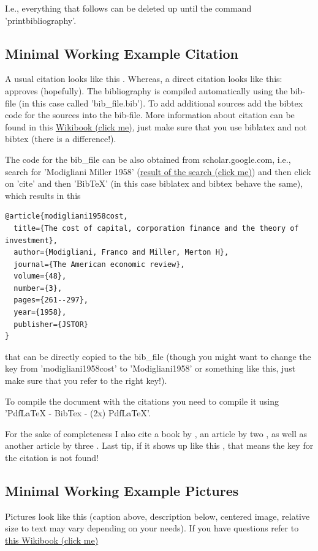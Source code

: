 \documentclass[12pt,a4paper]{article}
\begin{document}
I.e., everything that follows can be deleted up until the command 'printbibliography'.

\subsection{Minimal Working Example Citation}
A usual citation looks like this \parencite{R2016}. Whereas, a direct citation looks like this: \textcite{Leifeld2013} approves (hopefully). The bibliography is compiled automatically using the bib-file (in this case called 'bib\_file.bib'). To add additional sources add the bibtex code for the sources into the bib-file. More information about citation can be found in this \href{https://en.wikibooks.org/wiki/LaTeX/Bibliography_Management#biblatex}{Wikibook (click me)}, just make sure that you use biblatex and not bibtex (there is a difference!).

The code for the bib\_file can be also obtained from scholar.google.com, i.e., search for 'Modigliani Miller 1958' (\href{https://scholar.google.de/scholar?hl=en&q=modigliani+miller+1958&btnG=&as_sdt=1%2C5&as_sdtp=}{result of the search (click me)}) and then click on 'cite' and then 'BibTeX' (in this case biblatex and bibtex behave the same), which results in this 
\begin{verbatim}
@article{modigliani1958cost,
  title={The cost of capital, corporation finance and the theory of investment},
  author={Modigliani, Franco and Miller, Merton H},
  journal={The American economic review},
  volume={48},
  number={3},
  pages={261--297},
  year={1958},
  publisher={JSTOR}
}
\end{verbatim}

that can be directly copied to the bib\_file (though you might want to change the key from 'modigliani1958cost' to 'Modigliani1958' or something like this, just make sure that you refer to the right key!).

To compile the document with the citations you need to compile it using 'PdfLaTeX - BibTex - (2x) PdfLaTeX'.

For the sake of completeness I also cite a book by \textcite{Wilkinson2006}, an article by two \textcite{Modigliani1958}, as well as another article by three \textcite{Johnson2000}. Last tip, if it shows up like this \textcite{UnknownKey2000}, that means the key for the citation is not found!

\subsection{Minimal Working Example Pictures}
Pictures look like this (caption above, description below, centered image, relative size to text may vary depending on your needs). If you have questions refer to \href{https://en.wikibooks.org/wiki/LaTeX/Floats,_Figures_and_Captions}{this Wikibook (click me)}
\end{document}
